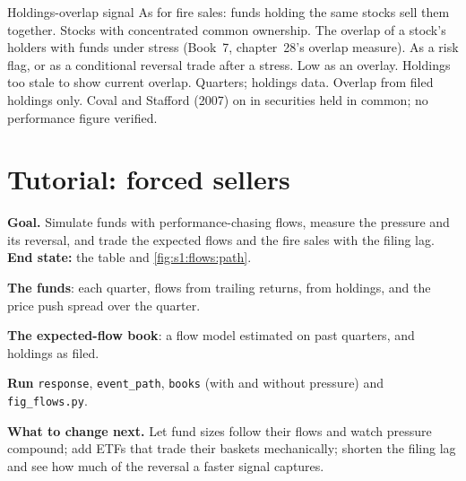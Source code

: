 \begin{strategyfile}{Holdings-overlap signal}\label{strat:s1:flows:overlap}
 As for fire sales: funds holding the same stocks sell them together.
 Stocks with concentrated common ownership.
 The overlap of a stock's holders with funds under stress (Book~7, chapter~28's overlap measure).
 As a risk flag, or as a conditional reversal trade after a stress.
 Low as an overlay.
 Holdings too stale to show current overlap.
 Quarters; holdings data.
 Overlap from filed holdings only.
 Coval and Stafford (2007) on  in securities held in common; no performance figure verified.
\end{strategyfile}

\section{Tutorial: forced sellers}\label{tut:s1:flows:tut}

\begin{tutorial}
\textbf{Goal.} Simulate funds with performance-chasing flows, measure the pressure and its reversal, and trade the expected flows and the fire sales with
the filing lag. \textbf{End state:} the table and \cref{fig:s1:flows:path}.
\begin{tutsteps}
\item \textbf{The funds}: each quarter, flows from trailing returns,  from holdings, and the price push spread over the quarter.
\label{lst:s1:flows:sim}
\item \textbf{The expected-flow book}: a flow model estimated on past quarters, and holdings as filed.
\label{lst:s1:flows:book}
\item \textbf{Run} \texttt{response}, \texttt{event\_path}, \texttt{books} (with and without pressure) and \texttt{fig\_flows.py}.
\end{tutsteps}
\textbf{What to change next.} Let fund sizes follow their flows and watch pressure compound; add ETFs that trade their baskets mechanically; shorten the
filing lag and see how much of the reversal a faster signal captures.
\end{tutorial}

